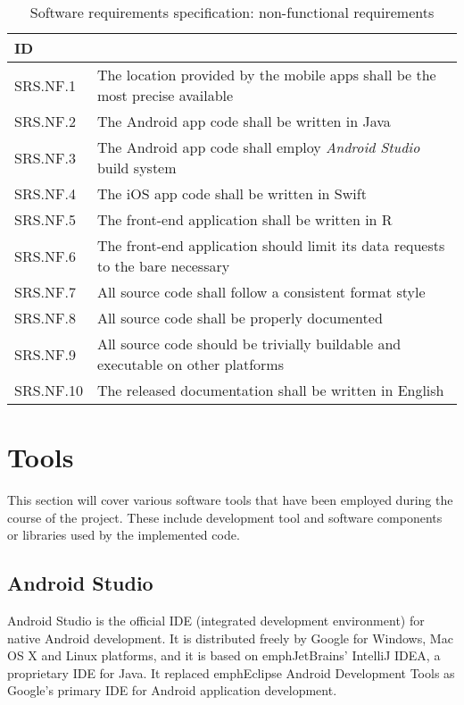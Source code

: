 \begin{table}[H]
\centerfloat
\begin{tabular}{@{} m{4em} >{\small}l @{}}
	\toprule
	ID			& \normalfont{Description} \\
	\midrule
	SRS.NF.1	& The location provided by the mobile apps shall be the most precise available \\
	SRS.NF.2	& The Android app code shall be written in Java \\
	SRS.NF.3	& The Android app code shall employ \emph{Android Studio} build system \\
	SRS.NF.4	& The iOS app code shall be written in Swift \\
	SRS.NF.5	& The front-end application shall be written in R \\
	SRS.NF.6	& The front-end application should limit its data requests to the bare necessary \\
	SRS.NF.7	& All source code shall follow a consistent format style \\
	SRS.NF.8	& All source code shall be properly documented \\
	SRS.NF.9	& All source code should be trivially buildable and executable on other platforms \\
	SRS.NF.10	& The released documentation shall be written in English \\
	\bottomrule
\end{tabular}
\caption{{\footnotesize Software requirements specification: non-functional requirements}}
\end{table}


\section{Tools}
This section will cover various software tools that have been employed during the course of the project.
These include development tool and software components or libraries used by the implemented code.


\subsection{Android Studio}
Android Studio is the official IDE (integrated development environment) for native Android development.
It is distributed freely by Google for Windows, Mac OS X and Linux platforms, and it is based on emph{JetBrains' IntelliJ IDEA}, a proprietary IDE for Java.
It replaced emph{Eclipse Android Development Tools} as Google's primary IDE for Android application development.

